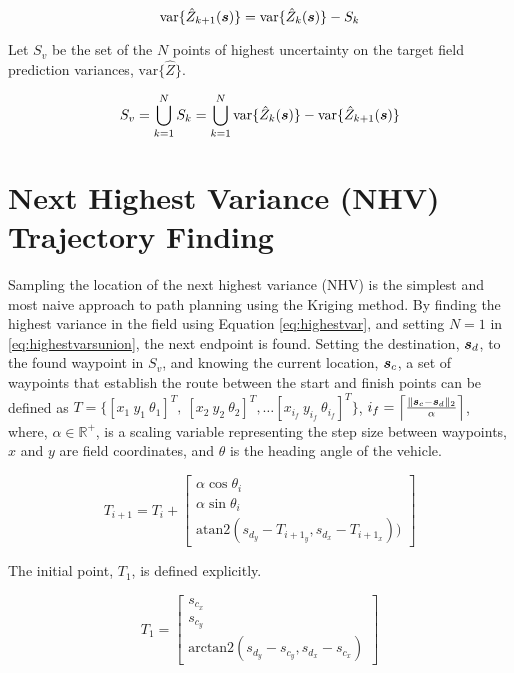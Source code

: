 \begin{equation}
	\text{var}\{\hat{Z}_{k+1}({\it{\boldsymbol{s}}})\} = \text{var}\{\hat{Z}_k({\it{\boldsymbol{s}}})\} - S_k \\
	\label{eq:nextmaxvarsset}
\end{equation}

Let $S_{v}$ be the set of the $N$ points of highest uncertainty on the target field prediction variances, $\text{var}\{\hat{Z}\}$.

\begin{equation}
	\label{eq:highestvarsunion}
	S_{v} = \bigcup_{k = 1}^{N} S_k = \bigcup_{k = 1}^{N} \text{var}\{\hat{Z}_k({\it{\boldsymbol{s}}})\} - \text{var}\{\hat{Z}_{k+1}({\it{\boldsymbol{s}}})\}
\end{equation}

\section{Next Highest Variance (NHV) Trajectory Finding} \label{sec:nhvtrajfind}
Sampling the location of the next highest variance (NHV) is the simplest and most naive approach to path planning using the Kriging method. By finding the highest variance in the field using Equation \ref{eq:highestvar}, and setting $N=1$ in \ref{eq:highestvarsunion}, the next endpoint is found. Setting the destination, ${\it{\boldsymbol{s}}}_d$, to the found waypoint in $S_{v}$, and knowing the current location, ${\it{\boldsymbol{s}}}_{c}$, a set of waypoints that establish the route between the start and finish points can be defined as $T = \Big\{[x_{1}\ y_{1}\ \theta_{1}]^T,\ [x_{2}\ y_{2}\ \theta_{2}]^T, \dots [x_{{i_f}}\ y_{{i_f}}\ \theta_{{i_f}}]^T \Big\}$, $i_f = \Big\lceil \frac{\|{\it{\boldsymbol{s}}}_c - {\it{\boldsymbol{s}}}_d\|_2}{\alpha} \Big\rceil$, where, $\alpha \in \mathbb{R}^{+}$, is a scaling variable representing the step size between waypoints, $x$ and $y$ are field coordinates, and $\theta$ is the heading angle of the vehicle. 

\begin{equation}
	\label{eq:nhvtrajectory}
	T_{{i + 1}} = T_{i} +
	\begin{bmatrix}
		\alpha \cos \theta_{i} \\
		\alpha \sin \theta_{i} \\
		\text{atan2}(s_{d_y} - T_{{{i+1}_y}}, s_{d_x} - T_{{{i+1}_x}}))
	\end{bmatrix}
\end{equation}

The initial point, $T_{1}$, is defined explicitly.

\begin{equation}
	T_{1} = \begin{bmatrix}
		s_{c_x} \\
		s_{c_y} \\
		\text{arctan2}(s_{d_y} - s_{c_y}, s_{d_x} - s_{c_x})
	\end{bmatrix}
\end{equation}

